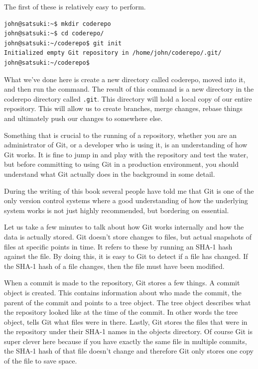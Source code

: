 The first of these is relatively easy to perform.

\begin{Verbatim}
john@satsuki:~$ mkdir coderepo
john@satsuki:~$ cd coderepo/
john@satsuki:~/coderepo$ git init
Initialized empty Git repository in /home/john/coderepo/.git/
john@satsuki:~/coderepo$
\end{Verbatim}

What we've done here is create a new directory called coderepo, moved into it, and then run the  command.
The result of this command is a new directory in the coderepo directory called \texttt{.git}.
This directory will hold a local copy of our entire repository.
This will allow us to create branches, merge changes, rebase things and ultimately push our changes to somewhere else.

Something that is crucial to the running of a repository, whether you are an administrator of Git, or a developer who is using it, is an understanding of how Git works.
It is fine to jump in and play with the repository and test the water, but before committing to using Git in a production environment, you should understand what Git actually does in the background in some detail.

During the writing of this book several people have told me that Git is one of the only version control systems where a good understanding of how the underlying system works is not just highly recommended, but bordering on essential.

Let us take a few minutes to talk about how Git works internally and how the data is actually stored.
Git doesn't store changes to files, but actual snapshots of files at specific points in time.
It refers to these by running an SHA-1 hash against the file.
By doing this, it is easy to Git to detect if a file has changed.
If the SHA-1 hash of a file changes, then the file must have been modified.

When a commit is made to the repository, Git stores a few things.
A commit object is created.
This contains information about who made the commit, the parent of the commit and points to a tree object.
The tree object describes what the repository looked like at the time of the commit.
In other words the tree object, tells Git what files were in there.
Lastly, Git stores the files that were in the repository under their SHA-1 names in the objects directory.
Of course Git is super clever here because if you have exactly the same file in multiple commits, the SHA-1 hash of that file doesn't change and therefore Git only stores one copy of the file to save space.


